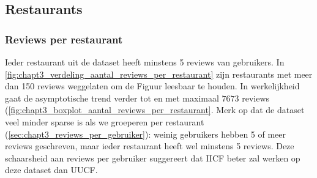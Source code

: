 \subsection{Restaurants}
\subsubsection{Reviews per restaurant}
Ieder restaurant uit de dataset heeft minstens 5 reviews van gebruikers. In \autoref{fig:chapt3_verdeling_aantal_reviews_per_restaurant} zijn restaurants met meer dan 150 reviews weggelaten om de Figuur leesbaar te houden. In werkelijkheid gaat de asymptotische trend verder tot en met maximaal $7673$ reviews (\autoref{fig:chapt3_boxplot_aantal_reviews_per_restaurant}. Merk op dat de dataset veel minder sparse is als we groeperen per restaurant (\ref{sec:chapt3_reviews_per_gebruiker}): weinig gebruikers hebben 5 of meer reviews geschreven, maar ieder restaurant heeft wel minstens 5 reviews. Deze schaarsheid aan reviews per gebruiker suggereert dat IICF beter zal werken op deze dataset dan UUCF. \cite{cursus_hs9}


